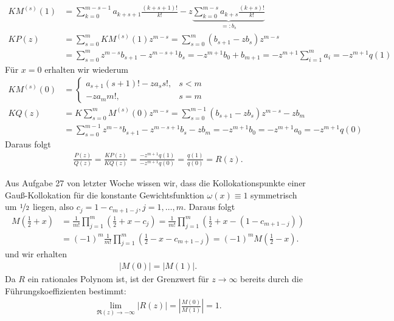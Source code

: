 \begin{solution}
\begin{align*}
  KM^{(s)}(1) &= \sum_{k=0}^{m-s-1}a_{k+s+1}\frac{(k+s+1)!}{k!}
  - z\underbrace{\sum_{k=0}^{m-s}a_{k+s}\frac{(k+s)!}{k!}}_{=: b_s} \\
  KP(z) &= \sum_{s=0}^m KM^{(s)}(1)z^{m-s} = \sum_{s=0}^m (b_{s+1} - zb_s)z^{m-s} \\
  &= \sum_{s=0}^m z^{m-s}b_{s+1} - z^{m-s+1}b_s
  = -z^{m+1}b_0 + b_{m+1}
  = -z^{m+1}\sum_{i=1}^m a_i
  = -z^{m+1}q(1)
\end{align*}
Für $x=0$ erhalten wir wiederum
\begin{align*}
  KM^{(s)}(0) &= \begin{cases}
    a_{s+1}(s+1)! - za_ss!, & s < m \\
    -za_mm!, & s = m
  \end{cases} \\
  KQ(z) &= K\sum_{s=0}^m M^{(s)}(0)z^{m-s} = \sum_{s=0}^{m-1}(b_{s+1}-zb_s)z^{m-s} - zb_m \\
  &= \sum_{s=0}^{m-1}z^{m-s}b_{s+1} - z^{m-s+1}b_s - zb_m
  = -z^{m+1}b_0
  = -z^{m+1}a_0
  = -z^{m+1}q(0)
\end{align*}
Daraus folgt
\begin{align*}
  \frac{P(z)}{Q(z)}=\frac{KP(z)}{KQ(z)} = \frac{-z^{m+1}q(1)}{-z^{m+1}q(0)} = \frac{q(1)}{q(0)} = R(z).
\end{align*}
\item
Aus Aufgabe 27 von letzter Woche wissen wir, dass die Kollokationspunkte einer
Gauß-Kollokation für die konstante Gewichtsfunktion $\omega(x) \equiv 1$
symmetrisch um $\nicefrac{1}{2}$ liegen, also $c_j = 1 - c_{m+1-j}, j = 1,\dots,m$.
Daraus folgt
\begin{align*}
  M\left(\frac{1}{2}+x\right) &= \frac{1}{m!}\prod_{j=1}^m\left(\frac{1}{2}+x-c_j\right)
  = \frac{1}{m!}\prod_{j=1}^m\left(\frac{1}{2}+x - (1 - c_{m+1-j})\right) \\
  &= (-1)^m\frac{1}{m!}\prod_{j=1}^m\left(\frac{1}{2} - x - c_{m+1-j}\right)
  = (-1)^m M\left(\frac{1}{2}-x\right).
\end{align*}
und wir erhalten
\begin{align*}
  |M(0)| = |M(1)|.
\end{align*}
Da $R$ ein rationales Polynom ist, ist der Grenzwert für $z \rightarrow \infty$
bereits durch die Führungskoeffizienten bestimmt:
\begin{align*}
  \lim_{\Re(z) \rightarrow -\infty} |R(z)| = \left|\frac{M(0)}{M(1)}\right| = 1.
\end{align*}
\end{solution}
